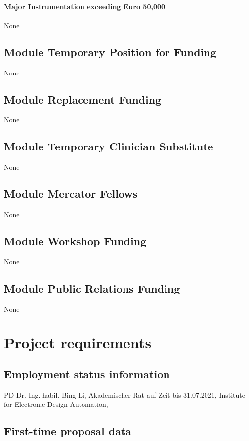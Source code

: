 \paragraph{Major Instrumentation exceeding Euro 50,000}
None
\vskip 8pt
\subsection{Module Temporary Position for Funding}
None
\vskip 8pt
\subsection{Module Replacement Funding}
None
\vskip 8pt
\subsection{Module Temporary Clinician Substitute}
None
\vskip 8pt
\subsection{Module Mercator Fellows}
None
\vskip 8pt
\subsection{Module Workshop Funding}
None
\vskip 8pt
\subsection{Module Public Relations Funding}
None
\vskip 8pt

\section{Project requirements}
\subsection{Employment status information}
PD Dr.-Ing. habil. Bing Li,
Akademischer Rat auf Zeit bis 31.07.2021,
Institute for Electronic Design Automation,
\tum



\vskip 12pt
\subsection{First-time proposal data}

